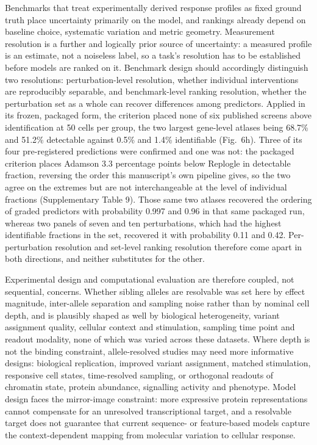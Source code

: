\documentclass[11pt,letterpaper]{article}
\begin{document}
Benchmarks that treat experimentally derived response profiles as fixed ground truth place uncertainty primarily on the model\cite{AIVirtualCell2024,scPerturb,Pertpy,PerturBench}, and rankings already depend on baseline choice, systematic variation and metric geometry\cite{AhlmannEltze2025,Systema}. Measurement resolution is a further and logically prior source of uncertainty: a measured profile is an estimate, not a noiseless label, so a task's resolution has to be established before models are ranked on it. Benchmark design should accordingly distinguish two resolutions: perturbation-level resolution, whether individual interventions are reproducibly separable, and benchmark-level ranking resolution, whether the perturbation set as a whole can recover differences among predictors. Applied in its frozen, packaged form, the criterion placed none of six published screens above identification at 50 cells per group, the two largest gene-level atlases being 68.7\% and 51.2\% detectable against 0.5\% and 1.4\% identifiable (Fig.~6h). Three of its four pre-registered predictions were confirmed and one was not: the packaged criterion places Adamson 3.3 percentage points below Replogle in detectable fraction, reversing the order this manuscript's own pipeline gives, so the two agree on the extremes but are not interchangeable at the level of individual fractions (Supplementary Table 9). Those same two atlases recovered the ordering of graded predictors with probability 0.997 and 0.96 in that same packaged run, whereas two panels of seven and ten perturbations, which had the highest identifiable fractions in the set, recovered it with probability 0.11 and 0.42. Per-perturbation resolution and set-level ranking resolution therefore come apart in both directions, and neither substitutes for the other.

Experimental design and computational evaluation are therefore coupled, not sequential, concerns. Whether sibling alleles are resolvable was set here by effect magnitude, inter-allele separation and sampling noise rather than by nominal cell depth, and is plausibly shaped as well by biological heterogeneity, variant assignment quality, cellular context and stimulation, sampling time point and readout modality, none of which was varied across these datasets. Where depth is not the binding constraint, allele-resolved studies may need more informative designs: biological replication, improved variant assignment, matched stimulation, responsive cell states, time-resolved sampling, or orthogonal readouts of chromatin state, protein abundance, signalling activity and phenotype. Model design faces the mirror-image constraint: more expressive protein representations cannot compensate for an unresolved transcriptional target, and a resolvable target does not guarantee that current sequence- or feature-based models capture the context-dependent mapping from molecular variation to cellular response.
\end{document}
